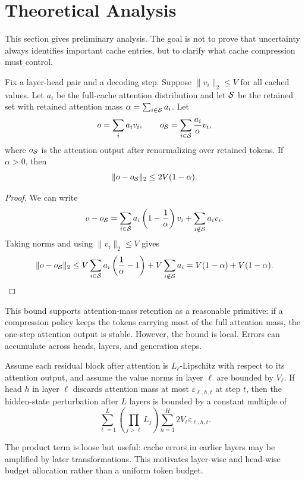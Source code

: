 \section{Theoretical Analysis}

This section gives preliminary analysis. The goal is not to prove that uncertainty always identifies important cache entries, but to clarify what cache compression must control.

\begin{proposition}
Fix a layer-head pair and a decoding step. Suppose $\|v_i\|_2 \le V$ for all cached values. Let $a_i$ be the full-cache attention distribution and let $\mathcal{S}$ be the retained set with retained attention mass $\alpha = \sum_{i\in\mathcal{S}} a_i$. Let
\[
o = \sum_i a_i v_i,
\qquad
o_{\mathcal{S}} = \sum_{i\in\mathcal{S}} \frac{a_i}{\alpha} v_i,
\]
where $o_{\mathcal{S}}$ is the attention output after renormalizing over retained tokens. If $\alpha>0$, then
\[
\|o-o_{\mathcal{S}}\|_2 \le 2V(1-\alpha).
\]
\end{proposition}

\begin{proof}
We can write
\[
o-o_{\mathcal{S}}
= \sum_{i\in\mathcal{S}} a_i\left(1-\frac{1}{\alpha}\right)v_i
+ \sum_{i\notin\mathcal{S}} a_i v_i .
\]
Taking norms and using $\|v_i\|_2\le V$ gives
\[
\|o-o_{\mathcal{S}}\|_2
\le V\sum_{i\in\mathcal{S}} a_i\left(\frac{1}{\alpha}-1\right)
+ V\sum_{i\notin\mathcal{S}} a_i
= V(1-\alpha)+V(1-\alpha).
\]
\end{proof}

This bound supports attention-mass retention as a reasonable primitive: if a compression policy keeps the tokens carrying most of the full attention mass, the one-step attention output is stable. However, the bound is local. Errors can accumulate across heads, layers, and generation steps.

\begin{proposition}
Assume each residual block after attention is $L_{\ell}$-Lipschitz with respect to its attention output, and assume the value norms in layer $\ell$ are bounded by $V_{\ell}$. If head $h$ in layer $\ell$ discards attention mass at most $\varepsilon_{\ell,h,t}$ at step $t$, then the hidden-state perturbation after $L$ layers is bounded by a constant multiple of
\[
\sum_{\ell=1}^{L}
\left(\prod_{j>\ell} L_j\right)
\sum_{h=1}^{H} 2V_{\ell}\varepsilon_{\ell,h,t}.
\]
\end{proposition}

The product term is loose but useful: cache errors in earlier layers may be amplified by later transformations. This motivates layer-wise and head-wise budget allocation rather than a uniform token budget.

